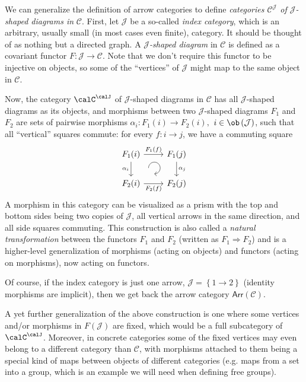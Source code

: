 \begin{defn}\label{categories of diagrams}
    We can generalize the definition of arrow categories to define \emph{categories
    $\mathcal{C}^\mathcal{J}$ of $\mathcal{J}$-shaped
    diagrams in} $\mathcal{C}$. First, let $\mathcal{J}$ be a so-called \emph{index
    category}, which is an arbitrary, usually small (in most cases even finite), category.
    It should be thought of as nothing but a directed graph. A \emph{$\mathcal{J}$-shaped
    diagram} in $\mathcal{C}$ is defined as a covariant functor $F:\mathcal{J}\to\mathcal{C}$.
    Note that we don't require this functor to be injective
    on objects, so some of the ``vertices'' of $\mathcal{J}$ might
    map to the same object in $\mathcal{C}$.

    Now, the category $\calC^\calJ$ of $\mathcal{J}$-shaped diagrams in $\mathcal{C}$
    has all $\mathcal{J}$-shaped diagrams as its objects, and morphisms
    between two $\mathcal{J}$-shaped diagrams $F_{1}$ and $F_{2}$ are
    sets of pairwise morphisms $\alpha_{i}:F_{1}\left(i\right)\to F_{2}\left(i\right),$
    $i\in\ob\left(\mathcal{J}\right)$, such that all ``vertical'' squares
    commute: for every $f:i\to j$, we have a commuting
    square
    \[\begin{tikzcd}[every matrix/.append style={name=m},   
    execute at end picture={\draw [<-] ([xshift=-2.7em,yshift=.3em]m-2-2.north) arc[start angle=-90,delta angle=270,radius=0.25cm];}]
    F_1(i)\arrow[r,"F_1(f)" ]\arrow[d,swap,"\alpha_i" ]& F_1(j) \arrow[d,"\alpha_j" ] \\
    F_2(i)\arrow[r,swap,"F_2(f)" ]& F_2(j)
    \end{tikzcd}\]
    A morphism in this category can be visualized as a prism with the
    top and bottom sides being two copies of $\mathcal{J}$, all vertical
    arrows in the same direction, and all side squares commuting. This
    construction is also called a \emph{natural transformation} between
    the functors $F_{1}$ and $F_{2}$ (written as $F_{1}\Longrightarrow F_{2}$)
    and is a higher-level generalization of morphisms (acting on objects)
    and functors (acting on morphisms), now acting on functors.

    Of course, if the index category is just one arrow, $\mathcal{J}=\left\{ 1\to2\right\} $
    (identity morphisms are implicit), then we get back the arrow category
    $\mathsf{Arr}\left(\mathcal{C}\right)$.
\end{defn}
%
\begin{example}
    A yet further generalization of the above construction is one where
    some vertices and/or morphisms in $F\left(\mathcal{J}\right)$ are
    fixed, which would be a full subcategory of $\calC^\calJ$.
    Moreover, in concrete categories some of the fixed vertices may even
    belong to a different category than $\mathcal{C}$, with morphisms
    attached to them being a special kind of maps between objects of different
    categories (e.g. maps from a set into a group, which is an example
    we will need when defining free groups).
\end{example}
